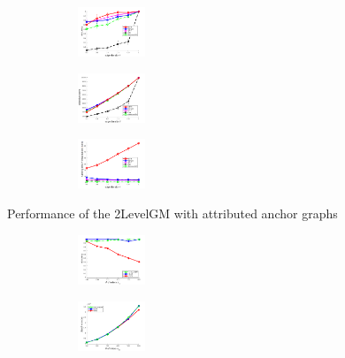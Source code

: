 \documentclass[hyperref={pdfpagelabels=false}]{beamer}
\begin{document}
\begin{frame}[allowframebreaks]
\vspace{-20pt}
\begin{figure}[h]
		\begin{subfigure}[b]{0.32\textwidth}
			\centering
			\includegraphics[width=2cm]{"fig/evaluation/SyntheticTest/descr/Results_v4.3.3/Test4/accuracy_avg10t"} 
		\end{subfigure}%
		\begin{subfigure}[b]{0.32\textwidth}
			\centering
			\includegraphics[width=2cm]{"fig/evaluation/SyntheticTest/descr/Results_v4.3.3/Test4/score_avg10t"} 
		\end{subfigure} 
		\begin{subfigure}[b]{0.32\textwidth}
			\centering
			\includegraphics[width=2cm]{"fig/evaluation/SyntheticTest/descr/Results_v4.3.3/Test4/time_summary_avg10t"} 
		\end{subfigure} 	
\end{figure}
Performance of the 2LevelGM with attributed anchor graphs
\framebreak
\vspace{-20pt}
\begin{figure}[h] 
		\begin{subfigure}[b]{0.32\textwidth}
			\centering
			\includegraphics[width=2.0cm]{"fig/evaluation/SyntheticTest_BigGraphs/descr/Results_v4.3.3/Test1/accuracy_avg1t"} 
		\end{subfigure}
		\begin{subfigure}[b]{0.32\textwidth}
			\centering
			\includegraphics[width=2.0cm]{"fig/evaluation/SyntheticTest_BigGraphs/descr/Results_v4.3.3/Test1/score_avg1t"} 

\end{subfigure}
\end{figure}
\end{frame}
\end{document}
